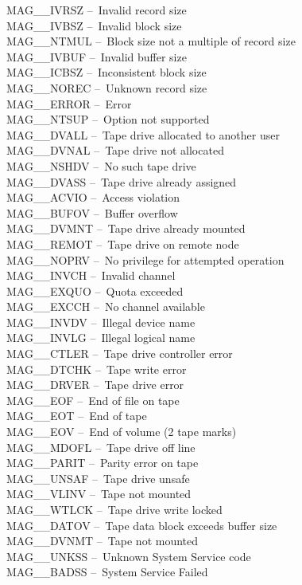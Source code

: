 \documentclass[11pt]{starlink}
\providecommand{\dash}{--}
\begin{document}
MAG\_\_IVRSZ  \dash\ Invalid record size \\
MAG\_\_IVBSZ  \dash\ Invalid block size \\
MAG\_\_NTMUL  \dash\ Block size not a multiple of record size \\
MAG\_\_IVBUF  \dash\ Invalid buffer size \\
MAG\_\_ICBSZ  \dash\ Inconsistent block size \\
MAG\_\_NOREC  \dash\ Unknown record size \\
MAG\_\_ERROR  \dash\ Error \\
MAG\_\_NTSUP  \dash\ Option not supported \\
MAG\_\_DVALL  \dash\ Tape drive allocated to another user \\
MAG\_\_DVNAL  \dash\ Tape drive not allocated \\
MAG\_\_NSHDV  \dash\ No such tape drive \\
MAG\_\_DVASS  \dash\ Tape drive already assigned \\
MAG\_\_ACVIO  \dash\ Access violation \\
MAG\_\_BUFOV  \dash\ Buffer overflow \\
MAG\_\_DVMNT  \dash\ Tape drive already mounted \\
MAG\_\_REMOT  \dash\ Tape drive on remote node \\
MAG\_\_NOPRV  \dash\ No privilege for attempted operation \\
MAG\_\_INVCH  \dash\ Invalid channel \\
MAG\_\_EXQUO  \dash\ Quota exceeded \\
MAG\_\_EXCCH  \dash\ No channel available \\
MAG\_\_INVDV  \dash\ Illegal device name \\
MAG\_\_INVLG  \dash\ Illegal logical name \\
MAG\_\_CTLER  \dash\ Tape drive controller error \\
MAG\_\_DTCHK  \dash\ Tape write error \\
MAG\_\_DRVER  \dash\ Tape drive error \\
MAG\_\_EOF    \dash\ End of file on tape \\
MAG\_\_EOT    \dash\ End of tape \\
MAG\_\_EOV    \dash\ End of volume (2 tape marks) \\
MAG\_\_MDOFL  \dash\ Tape drive off line \\
MAG\_\_PARIT  \dash\ Parity error on tape \\
MAG\_\_UNSAF  \dash\ Tape drive unsafe \\
MAG\_\_VLINV  \dash\ Tape not mounted \\
MAG\_\_WTLCK  \dash\ Tape drive write locked \\
MAG\_\_DATOV  \dash\ Tape data block exceeds buffer size \\
MAG\_\_DVNMT  \dash\ Tape not mounted \\
MAG\_\_UNKSS  \dash\ Unknown System Service code \\
MAG\_\_BADSS  \dash\ System Service Failed
\end{document}
